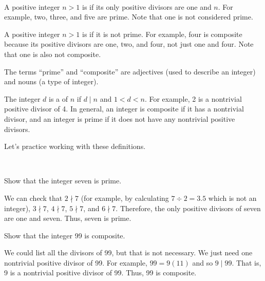 \begin{defn}[Prime]
\label{defn_prime}
~
    \begin{apart}
        \item A positive integer $n>1$ is  if its only positive divisors are one and $n$.  For example, two, three, and five are prime.  Note that one is not considered prime.
        \item A positive integer $n>1$ is  if it is not prime.  For example, four is composite because its positive divisors are one, two, and four, not just one and four.  Note that one is also not composite.
        \item The terms ``prime'' and ``composite'' are adjectives (used to describe an integer) and nouns (a type of integer).
        \item The integer $d$ is a  of $n$ if $d \mid n$ and $1 < d < n$.  For example, 2 is a nontrivial positive divisor of 4.  In general, an integer is composite if it has a nontrivial divisor, and an integer is prime if it does not have any nontrivial positive divisors.
    \end{apart}
\end{defn}

Let's practice working with these definitions.

\begin{exam}
\label{exam_show_prime}   
~
    \begin{apart}
        \item \label{part_7_is_prime} Show that the integer seven is prime.
            \begin{soln}
                We can check that $2 \nmid 7$ (for example, by calculating $7 \div 2 = 3.5$ which is not an integer), $3 \nmid 7$, $4 \nmid 7$, $5 \nmid 7$, and $6 \nmid 7$.  Therefore, the only positive divisors of seven are one and seven. Thus, seven is prime.
            \end{soln}
        \item Show that the integer 99 is composite.
            \begin{soln}
                We could list all the divisors of 99, but that is not necessary. We just need one nontrivial positive divisor of 99.  For example, $99 = 9(11)$ and so $9 \mid 99$. That is, 9 is a nontrivial positive divisor of 99. Thus, 99 is composite.
            \end{soln}
    \end{apart}
\end{exam}


